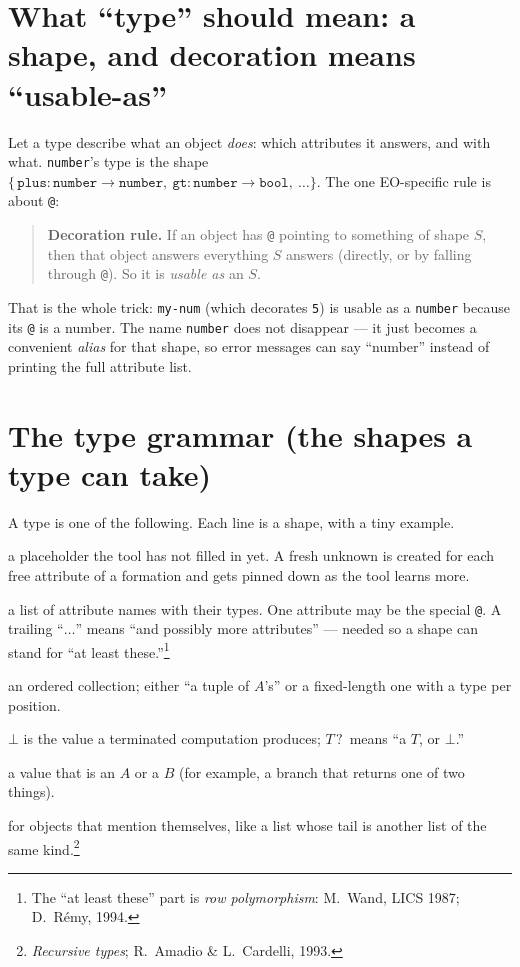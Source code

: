 \documentclass[10pt]{article}
\newcommand{\ty}[1]{\mathtt{#1}}     %
\newcommand{\arr}{\to}               %
\newcommand{\opt}{\mathbin{?}}       %
\begin{document}
\section{What ``type'' should mean: a shape, and decoration means ``usable-as''}

Let a type describe what an object \emph{does}: which attributes it answers, and
with what. \verb|number|'s type is the shape
$\{\,\ty{plus}:\ty{number}\arr\ty{number},\ \ty{gt}:\ty{number}\arr\ty{bool},\ \dots\}$.
The one EO-specific rule is about \texttt{@}:

\begin{quote}
\textbf{Decoration rule.} If an object has \texttt{@} pointing to something of
shape $S$, then that object answers everything $S$ answers (directly, or by
falling through \texttt{@}). So it is \emph{usable as} an $S$.
\end{quote}

That is the whole trick: \verb|my-num| (which decorates \verb|5|) is usable as a
\verb|number| because its \texttt{@} is a number. The name \verb|number| does
not disappear --- it just becomes a convenient \emph{alias} for that shape, so
error messages can say ``number'' instead of printing the full attribute list.

\section{The type grammar (the shapes a type can take)}\label{sec:grammar}

A type is one of the following. Each line is a shape, with a tiny example.

\begin{description}\setlength{\itemsep}{2pt}
\item[An unknown, written $A$, $B$, \dots] a placeholder the tool has not filled
  in yet. A fresh unknown is created for each free attribute of a formation and
  gets pinned down as the tool learns more.
\item[An object shape $\{\,\ell_1:\tau_1,\ \dots,\ \ell_n:\tau_n\,\}$] a list of
  attribute names with their types. One attribute may be the special
  \texttt{@}. A trailing ``$\dots$'' means ``and possibly more attributes'' ---
  needed so a shape can stand for ``at least these.''\footnote{The ``at least
  these'' part is \emph{row polymorphism}: M.~Wand, LICS 1987; D.~R\'emy, 1994.}
\item[A tuple, $\ty{tuple}\ A$ or $\langle A, B, C\rangle$] an ordered
  collection; either ``a tuple of $A$'s'' or a fixed-length one with a type per
  position.
\item[Failure, $\bot$, and the option $T\opt$] $\bot$ is the value a terminated
  computation produces; $T\opt$ means ``a $T$, or $\bot$.''
\item[Either/or, $A \mid B$] a value that is an $A$ or a $B$ (for example, a
  branch that returns one of two things).
\item[A self-referring shape, ``loop $A.\ \dots$''] for objects that mention
  themselves, like a list whose tail is another list of the same
  kind.\footnote{\emph{Recursive types}; R.~Amadio \& L.~Cardelli, 1993.}
\end{description}
\end{document}
